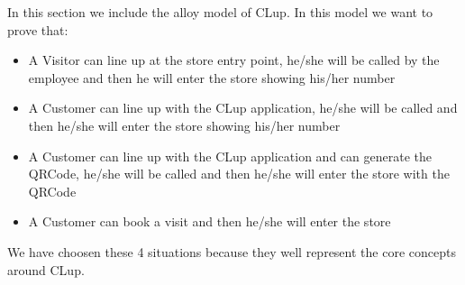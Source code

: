 In this section we include the alloy model of CLup. In this model we want to prove that:
\begin{itemize}
    \item A Visitor can line up at the store entry point, he/she will be called by the employee and then he will enter the store showing his/her number
    \item A Customer can line up with the CLup application, he/she will be called and then he/she will enter the store showing his/her number
    \item A Customer can line up with the CLup application and can generate the QRCode, he/she will be called and then he/she will enter the store with the QRCode
    \item A Customer can book a visit and then he/she will enter the store
\end{itemize}
We have choosen these 4 situations because they well represent the core concepts around CLup.